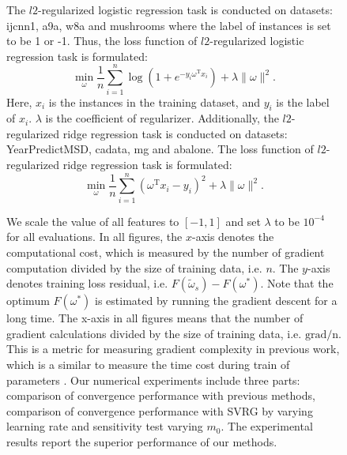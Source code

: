 \documentclass[conference]{IEEEtran}
\begin{document}
\begin{itemize}
\begin{figure}[ht]
 The $l2$-regularized logistic regression task is conducted on datasets: ijcnn1, a9a, w8a and mushrooms where the label of instances  is set to be 1 or -1. Thus, the loss function of $l2$-regularized logistic regression task is formulated:
\begin{equation}
\label{logistic_reg}
\min\limits_\omega \frac{1}{n}\sum\limits_{i=1}^n \log(1+e^{-y_i \omega^\mathrm{T} x_i }) + \lambda \parallel \omega \parallel^2.
\end{equation} Here, $x_i$ is the instances in the training dataset, and $y_i$ is the label of $x_i$. $\lambda$ is the coefficient of regularizer. Additionally, the $l2$-regularized ridge regression task is conducted on  datasets: YearPredictMSD, cadata, mg and abalone. The loss function of $l2$-regularized ridge regression task is formulated:
\begin{equation}
\label{ridge_reg}
\min\limits_\omega \frac{1}{n}\sum\limits_{i=1}^n\left(\omega^{\mathrm{T}}x_i-y_i\right)^2 + \lambda \parallel \omega \parallel^2.
\end{equation}

We scale the value of all features to $[-1,1]$ and set  $\lambda$ to be $10^{-4}$ for all evaluations. 
In all figures, the $x$-axis denotes the computational cost, which is measured by the number of gradient computation divided by the size of training data, i.e. $n$. The $y$-axis denotes training loss residual, i.e. $F(\tilde{\omega}_s) - F(\omega^{*})$. Note that the optimum $F(\omega^{*})$ is estimated by running the gradient descent for a long time. The x-axis in all figures means that the number of gradient calculations divided by the size of training data, i.e. $\mathrm{grad/n}$. This is a metric for measuring gradient complexity in previous work, which is a similar to measure the time cost during train of parameters \cite{aaa, dddd, dddd}. Our numerical experiments include three parts: comparison of convergence performance with previous methods, comparison of convergence performance with SVRG by varying learning rate and sensitivity test varying $m_0$. The experimental results report the superior performance of our methods. 




\end{figure}
\end{itemize}
\end{document}

